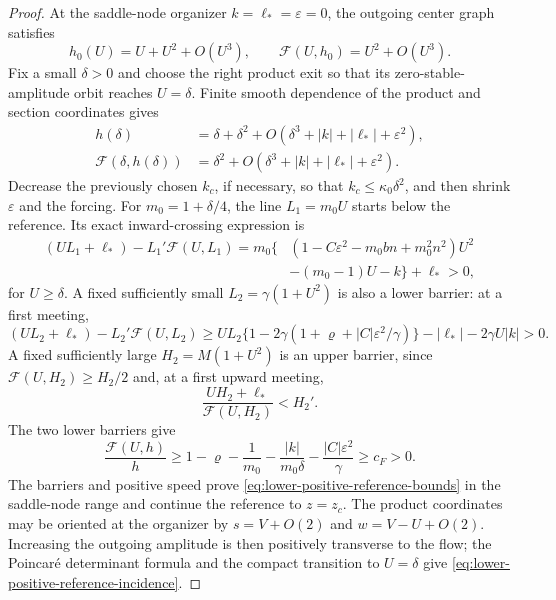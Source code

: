 \begin{proof}
At the saddle-node organizer $k=\ell_*=\varepsilon=0$, the outgoing
center graph satisfies
\[
 h_0(U)=U+U^2+O(U^3),\qquad
 \mathcal F(U,h_0)=U^2+O(U^3).
\]
Fix a small $\delta>0$ and choose the right product exit so that its
zero-stable-amplitude orbit reaches $U=\delta$.  Finite smooth dependence
of the product and section coordinates gives
\begin{equation}\label{eq:lower-central-reference-entry}
 \begin{aligned}
 h(\delta)&=\delta+\delta^2
       +O(\delta^3+|k|+|\ell_*|+\varepsilon^2),\\
 \mathcal F(\delta,h(\delta))&=\delta^2
       +O(\delta^3+|k|+|\ell_*|+\varepsilon^2).
 \end{aligned}
\end{equation}
Decrease the previously chosen $k_c$, if necessary, so that
$k_c\le\kappa_0\delta^2$, and then shrink $\varepsilon$ and the forcing.
For $m_0=1+\delta/4$, the line $L_1=m_0U$ starts below the reference.
Its exact inward-crossing expression is
\begin{equation}\label{eq:lower-central-reference-linear}
 \begin{split}
 (UL_1+\ell_*)-L_1'\mathcal F(U,L_1)
 =m_0\{&(1-C\varepsilon^2-m_0bn+m_0^2n^2)U^2\\
       &-(m_0-1)U-k\}+\ell_*>0,
 \end{split}
\end{equation}
for $U\ge\delta$.  A fixed sufficiently small
$L_2=\gamma(1+U^2)$ is also a lower barrier: at a first meeting,
\[
 (UL_2+\ell_*)-L_2'\mathcal F(U,L_2)
 \ge UL_2\{1-2\gamma(1+\varrho+|C|\varepsilon^2/\gamma)\}
       -|\ell_*|-2\gamma U|k|>0.
\]
A fixed sufficiently large $H_2=M(1+U^2)$ is an upper barrier, since
$\mathcal F(U,H_2)\ge H_2/2$ and, at a first upward meeting,
\[
 \frac{UH_2+\ell_*}{\mathcal F(U,H_2)}<H_2'.
\]
The two lower barriers give
\begin{equation}\label{eq:lower-central-reference-speed}
 \frac{\mathcal F(U,h)}h
 \ge1-\varrho-\frac1{m_0}
       -\frac{|k|}{m_0\delta}-\frac{|C|\varepsilon^2}{\gamma}
 \ge c_F>0.
\end{equation}
The barriers and positive speed prove
\eqref{eq:lower-positive-reference-bounds} in the saddle-node range and
continue the reference to $z=z_c$.
The product coordinates may be oriented at the organizer by
$s=V+O(2)$ and $w=V-U+O(2)$.  Increasing the outgoing amplitude is then
positively transverse to the flow; the Poincar\'e determinant formula
and the compact transition to $U=\delta$ give
\eqref{eq:lower-positive-reference-incidence}.


\end{proof}
